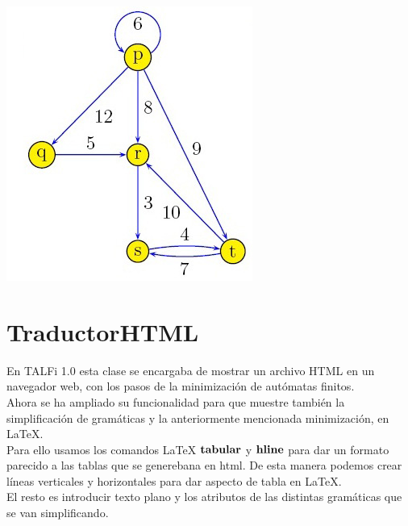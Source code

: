 \documentclass[12pt,a4paper,spanish]{book}
\begin{document}
\begin{center}
\includegraphics{latee2.jpg}
\end{center}

\section{TraductorHTML}

En TALFi 1.0 esta clase se encargaba de mostrar un archivo HTML en un navegador web, con los pasos de la minimizaci\'on de aut\'omatas finitos.\\
\newline
Ahora se ha ampliado su funcionalidad para que muestre tambi\'en la simplificaci\'on de gram\'aticas y la anteriormente mencionada minimizaci\'on, en \LaTeX{}.\\
\newline
Para ello usamos los comandos \LaTeX{} $\bf{tabular}$ y $\bf{hline}$ para dar un formato parecido a las tablas que se generebana en html. De esta manera podemos crear l\'ineas verticales y horizontales para dar aspecto de tabla en \LaTeX{}.\\
\newline
El resto es introducir texto plano y los atributos de las distintas gram\'aticas que se van simplificando.\newline
\end{document}

